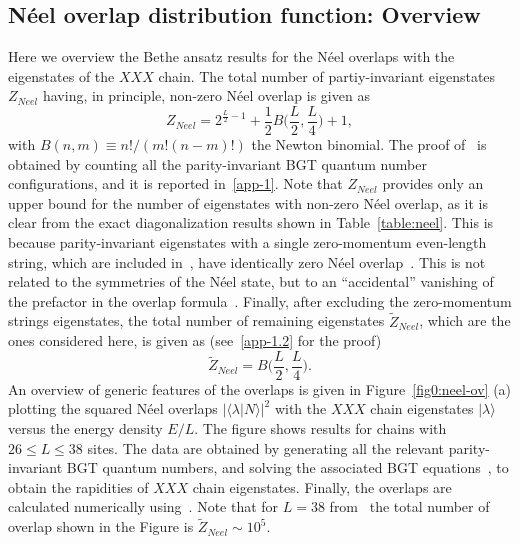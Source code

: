 \documentclass[11pt]{iopart}
\begin{document}
\subsection{N\'eel overlap distribution function: Overview}
\label{sec:5.1}

Here we overview the Bethe ansatz results for the N\'eel overlaps with the 
eigenstates of the $XXX$ chain. The total number of partiy-invariant 
eigenstates $Z_{Neel}$ having, in principle, non-zero N\'eel overlap is given 
as 
%
\begin{equation}
\label{zneel1}
Z_{Neel}=2^{\frac{L}{2}-1}+\frac{1}{2}B\Big(\frac{L}{2},\frac{L}{4}\Big)+1, 
\end{equation}
%
with $B(n,m)\equiv n!/(m!(n-m)!)$ the Newton binomial. The proof of~ 
is obtained by counting all the parity-invariant BGT quantum number configurations, 
and it is reported in~\ref{app-1}. Note that $Z_{Neel}$ provides only an upper 
bound for the number of eigenstates with non-zero N\'eel overlap, as it is clear 
from the exact diagonalization results shown in Table~\ref{table:neel}. This is 
because parity-invariant eigenstates with a single zero-momentum even-length 
string, which are included in~, have identically zero N\'eel 
overlap~\cite{brockmann-2014}. This is not related to the symmetries of the N\'eel 
state, but to an ``accidental'' vanishing of the prefactor in the overlap 
formula~. Finally, after excluding the zero-momentum strings 
eigenstates, the total number of remaining eigenstates $\widetilde Z_{Neel}$, 
which are the ones considered here, is given as (see~\ref{app-1.2} for the proof) 
%
\begin{equation}
\label{ztilde}
\widetilde Z_{Neel}=B\Big(\frac{L}{2},\frac{L}{4}\Big).
\end{equation}
%
An overview of generic features of the overlaps is given in Figure~\ref{fig0:neel-ov} 
(a) plotting the squared N\'eel overlaps $|\langle\lambda|N\rangle|^2$ with the $XXX$ 
chain eigenstates $|\lambda\rangle$ versus the energy density $E/L$. The figure shows 
results for chains with $26\le L\le 38$ sites. The data are obtained by generating all 
the relevant parity-invariant BGT quantum numbers, and solving the associated BGT 
equations~, to obtain the rapidities of $XXX$ chain eigenstates. Finally, 
the overlaps are calculated numerically using~. Note that for $L=38$ 
from~ the total number of overlap shown in the Figure is $\widetilde Z_{Neel}
\sim 10^5$. 
\end{document}
